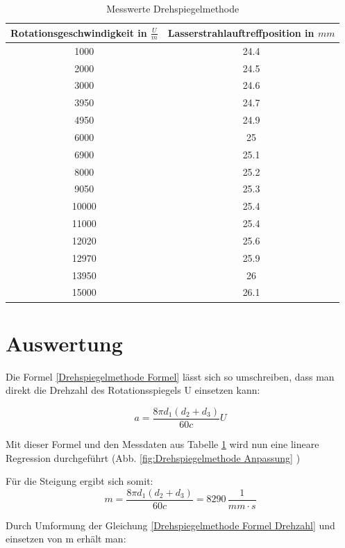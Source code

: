 \begin{table}[h]
    \centering
    \caption{Messwerte Drehspiegelmethode}
    \label{tab:Messwerte Drehspiegelmethode}
    \begin{tabular}{c c}
    \hline
    Rotationsgeschwindigkeit in $\frac{U}{m}$ & Lasserstrahlauftreffposition in $mm$ \\
    \hline
    1000 & 24.4 \\
    2000 & 24.5 \\
    3000 & 24.6 \\
    3950 & 24.7  \\
    4950 & 24.9 \\
    6000 & 25 \\
    6900 & 25.1\\
    8000 & 25.2 \\
    9050 & 25.3 \\
    10000 & 25.4 \\
    11000 & 25.4 \\
    12020 & 25.6 \\
    12970 & 25.9 \\
    13950 & 26 \\
    15000 & 26.1 \\
    \hline
    \end{tabular}
\end{table}

\section{Auswertung}

Die Formel \ref{Drehspiegelmethode Formel} lässt sich so umschreiben, dass man direkt die Drehzahl des Rotationsspiegels U einsetzen kann: 

\begin{equation} \label{Drehspiegelmethode Formel Drehzahl}
    a = \frac{8 \pi  d_1 (d_2 + d_3)}{60c} U
\end{equation}

Mit dieser Formel und den Messdaten aus Tabelle \ref{tab:Messwerte Drehspiegelmethode} wird nun eine lineare Regression durchgeführt (Abb. \ref{fig:Drehspiegelmethode Anpassung} )

Für die Steigung ergibt sich somit: 
\begin{equation} \label{Steigung Drehspiegelmethode}
    m = \frac{8 \pi  d_1 (d_2 + d_3)}{60c} = 8290 \, \frac{1}{mm\cdot s}
\end{equation}

Durch Umformung der Gleichung \ref{Drehspiegelmethode Formel Drehzahl} und einsetzen von m erhält man:

